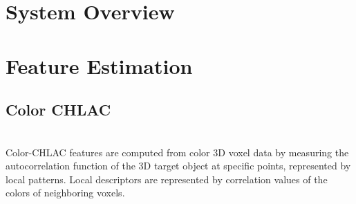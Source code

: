 \documentclass[conference]{sty/IEEEtran}
\begin{document}
\section{System Overview}
\label{sec:overview}

\section{Feature Estimation}
\label{sec:features}

\subsection{Color CHLAC}
\\
Color-CHLAC features are computed from color 3D voxel data by measuring
    the autocorrelation function of the 3D target object at specific points,
    represented by local patterns.
Local descriptors are represented by correlation values of the colors of neighboring voxels.
\end{document}
